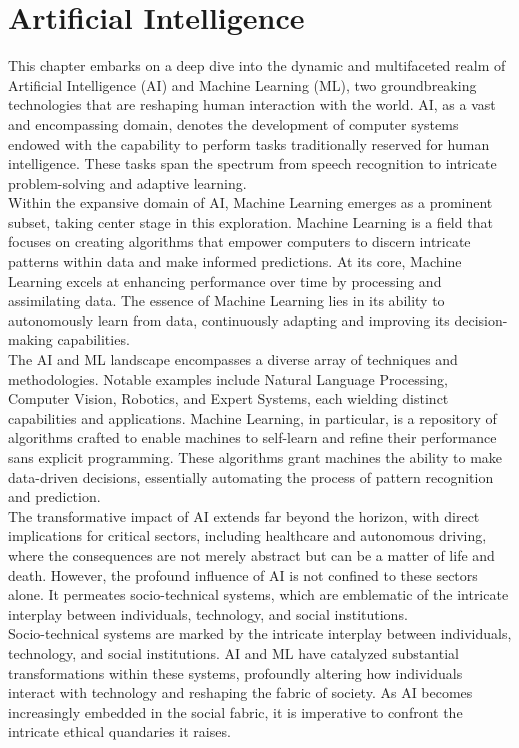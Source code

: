 \documentclass[12pt,a4paper,openright,twoside]{book}
\begin{document}
\section{Artificial Intelligence}
This chapter embarks on a deep dive into the dynamic and multifaceted realm of Artificial Intelligence (AI) and Machine Learning (ML), two groundbreaking technologies that are reshaping human interaction with the world. AI, as a vast and encompassing domain, denotes the development of computer systems endowed with the capability to perform tasks traditionally reserved for human intelligence. These tasks span the spectrum from speech recognition to intricate problem-solving and adaptive learning. \\
Within the expansive domain of AI, Machine Learning emerges as a prominent subset, taking center stage in this exploration. Machine Learning is a field that focuses on creating algorithms that empower computers to discern intricate patterns within data and make informed predictions. At its core, Machine Learning excels at enhancing performance over time by processing and assimilating data. The essence of Machine Learning lies in its ability to autonomously learn from data, continuously adapting and improving its decision-making capabilities. \\
The AI and ML landscape encompasses a diverse array of techniques and methodologies. Notable examples include Natural Language Processing, Computer Vision, Robotics, and Expert Systems, each wielding distinct capabilities and applications. Machine Learning, in particular, is a repository of algorithms crafted to enable machines to self-learn and refine their performance sans explicit programming. These algorithms grant machines the ability to make data-driven decisions, essentially automating the process of pattern recognition and prediction. \\
The transformative impact of AI extends far beyond the horizon, with direct implications for critical sectors, including healthcare and autonomous driving, where the consequences are not merely abstract but can be a matter of life and death. However, the profound influence of AI is not confined to these sectors alone. It permeates socio-technical systems, which are emblematic of the intricate interplay between individuals, technology, and social institutions. \\
Socio-technical systems are marked by the intricate interplay between individuals, technology, and social institutions. AI and ML have catalyzed substantial transformations within these systems, profoundly altering how individuals interact with technology and reshaping the fabric of society. As AI becomes increasingly embedded in the social fabric, it is imperative to confront the intricate ethical quandaries it raises. \\
\end{document}
